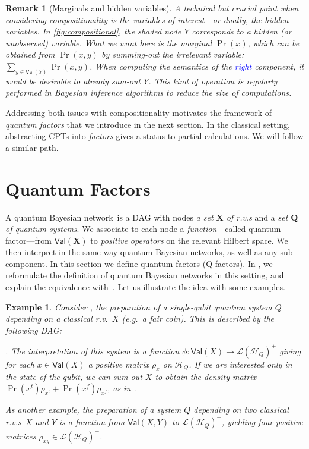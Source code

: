 \documentclass[10pt,a4paper]{article}
\newcommand*{\eg}{\emph{e.g.}\xspace}
\newcommand*{\setofrv}[1]{\mathsf{Val}(#1)}
\newcommand{\Val}[1]{\mathsf{Val}(#1)}
\newcommand{\bX}{\mathbf X}
\renewcommand{\L}{\mathcal{L}}
\newcommand{\Pos}[1]{{\L(#1)}^+}
\newcommand{\HH}{\mathcal{H}}
\newcommand{\M}{\rho}
\newcommand{\reg}{Q}
\newcommand{\qreg}{\reg}
\newcommand{\bQ}{\mathbf Q}
\newcommand{\rv}{r.v.\xspace}
\newcommand{\rvs}{r.v.s\xspace}
\newcommand*{\qfactor}{Q-factor}
\newcommand*{\Qfactor}{\qfactor}
\newcommand*{\QBN}{quantum Bayesian network}
\newtheorem{example}[theorem]{Example}
\newtheorem{remark}[theorem]{Remark}
\begin{document}
\begin{remark}[Marginals and hidden variables]
\label{rem:marginals}
A technical but crucial point when considering compositionality is the variables of interest---or dually, the hidden variables.
In \cref{fig:compositional}, the shaded node $Y$ corresponds to a hidden (or unobserved) variable.
What we want here is the marginal $\Pr(x)$, which can be obtained from $\Pr(x,y)$ by summing-out the irrelevant variable: $\sum_{y \in \setofrv{Y}} \Pr(x,y)$.
When computing the semantics of the \textcolor{blue}{right} component, it would be desirable to already sum-out $Y$.
This kind of operation is regularly performed in Bayesian inference algorithms to reduce the size of computations.
\end{remark}

Addressing both issues with compositionality motivates the framework of \emph{quantum factors} that we introduce in the next section.
In the classical setting, abstracting CPTs into \emph{factors} gives a status to partial calculations. We will follow a similar path.


\section{Quantum Factors}
\label{sec:semantic}

A \QBN\ is a DAG with nodes \emph{a set $\bX$ of \rvs} and a \emph{set $\bQ$ of quantum systems}.
We associate to each node a \emph{function}---called quantum factor---from $\Val{\bX}$ to \emph{positive operators} on the relevant Hilbert space.
We then interpret in the same way \QBN s, as well as any sub-component.
In this section we define quantum factors (\Qfactor s).
In , we reformulate the definition of \QBN s in this setting, and explain the equivalence with~\cite{GBN2014}.
Let us illustrate the idea with some examples.

\begin{example}
Consider , the preparation of a single-qubit quantum system $\qreg$ depending on a classical \rv\ $X$ (\eg\ a fair coin).
This is described by the following DAG:
.
The interpretation of this system is a function $\phi: \Val{X} \to \Pos{\HH_Q}$ giving for each $x \in \Val{X}$ a positive matrix $\M_{x}$ on $\HH_\qreg$.
If we are interested only in the state of the qubit, we can sum-out $X$ to obtain the density matrix $\Pr(x^t) \M_{x^t}+ \Pr(x^f) \M_{x^f}$, as in .

As another example, the preparation of a system $\qreg$ depending on two classical \rvs\ $X$ and $Y$ is a function from $\Val{X,Y}$ to $\Pos{\HH_\qreg}$, yielding four positive matrices $\M_{xy}\in\Pos{\HH_\qreg}$.
\end{example}
\end{document}
